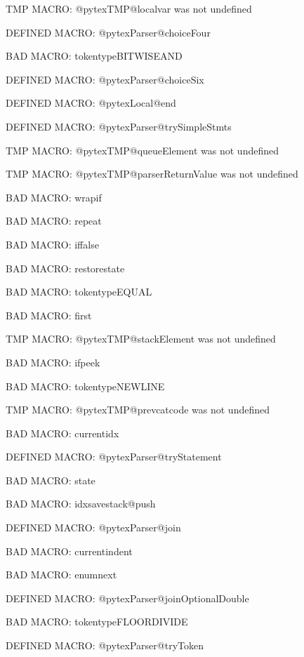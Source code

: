 \ifx\@pytexTMP@localvar\undefined\else TMP MACRO: @pytexTMP@localvar was not undefined
\fi

\ifx\@pytexParser@choiceFour\undefined\else DEFINED MACRO: @pytexParser@choiceFour
\fi

BAD MACRO: tokentypeBITWISEAND

\ifx\@pytexParser@choiceSix\undefined\else DEFINED MACRO: @pytexParser@choiceSix
\fi

\ifx\@pytexLocal@end\undefined\else DEFINED MACRO: @pytexLocal@end
\fi

\ifx\@pytexParser@trySimpleStmts\undefined\else DEFINED MACRO: @pytexParser@trySimpleStmts
\fi

\ifx\@pytexTMP@queueElement\undefined\else TMP MACRO: @pytexTMP@queueElement was not undefined
\fi

\ifx\@pytexTMP@parserReturnValue\undefined\else TMP MACRO: @pytexTMP@parserReturnValue was not undefined
\fi

BAD MACRO: wrapif

BAD MACRO: repeat

BAD MACRO: iffalse

BAD MACRO: restorestate

BAD MACRO: tokentypeEQUAL

BAD MACRO: first

\ifx\@pytexTMP@stackElement\undefined\else TMP MACRO: @pytexTMP@stackElement was not undefined
\fi

BAD MACRO: ifpeek

BAD MACRO: tokentypeNEWLINE

\ifx\@pytexTMP@prevcatcode\undefined\else TMP MACRO: @pytexTMP@prevcatcode was not undefined
\fi

BAD MACRO: currentidx

\ifx\@pytexParser@tryStatement\undefined\else DEFINED MACRO: @pytexParser@tryStatement
\fi

BAD MACRO: state

BAD MACRO: idxsavestack@push

\ifx\@pytexParser@join\undefined\else DEFINED MACRO: @pytexParser@join
\fi

BAD MACRO: currentindent

BAD MACRO: enumnext

\ifx\@pytexParser@joinOptionalDouble\undefined\else DEFINED MACRO: @pytexParser@joinOptionalDouble
\fi

BAD MACRO: tokentypeFLOORDIVIDE

\ifx\@pytexParser@tryToken\undefined\else DEFINED MACRO: @pytexParser@tryToken
\fi


